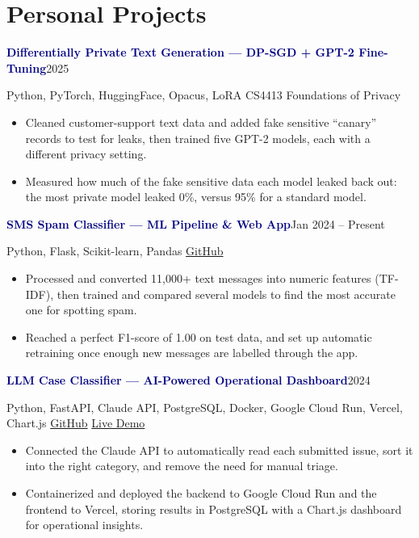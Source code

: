 \documentclass[11.5pt, letterpaper]{article}
\newcommand{\entry}[2]{\vspace{6pt}\noindent\textcolor{navy}{\bfseries #1}\hfill\textcolor{meta}{#2}\par}
\newcommand{\sub}[1]{\noindent\textcolor{meta}{#1}\par\vspace{4pt}}
\begin{document}
\section{Personal Projects}
\entry{Differentially Private Text Generation --- DP-SGD + GPT-2 Fine-Tuning}{2025}
\sub{Python, PyTorch, HuggingFace, Opacus, LoRA \enspace\textcolor{meta}{\textbullet}\enspace CS4413 Foundations of Privacy}
\begin{itemize}
  \item Cleaned customer-support text data and added fake sensitive ``canary'' records to test for leaks, then trained five GPT-2 models, each with a different privacy setting.
  \item Measured how much of the fake sensitive data each model leaked back out: the most private model leaked 0\%, versus 95\% for a standard model.
\end{itemize}
\entry{SMS Spam Classifier --- ML Pipeline \& Web App}{Jan 2024 -- Present}
\sub{Python, Flask, Scikit-learn, Pandas \enspace\textcolor{meta}{\textbullet}\enspace \href{https://github.com/Kazisakin/SMS-Spam-Classifier}{GitHub}}
\begin{itemize}
  \item Processed and converted 11,000+ text messages into numeric features (TF-IDF), then trained and compared several models to find the most accurate one for spotting spam.
  \item Reached a perfect F1-score of 1.00 on test data, and set up automatic retraining once enough new messages are labelled through the app.
\end{itemize}
\entry{LLM Case Classifier --- AI-Powered Operational Dashboard}{2024}
\sub{Python, FastAPI, Claude API, PostgreSQL, Docker, Google Cloud Run, Vercel, Chart.js \enspace\textcolor{meta}{\textbullet}\enspace \href{https://github.com/Kazisakin/llm-case-classifier-app}{GitHub} \enspace\textcolor{meta}{\textbullet}\enspace \href{https://llm-case-classifier-app-igs3.vercel.app}{Live Demo}}
\begin{itemize}
  \item Connected the Claude API to automatically read each submitted issue, sort it into the right category, and remove the need for manual triage.
  \item Containerized and deployed the backend to Google Cloud Run and the frontend to Vercel, storing results in PostgreSQL with a Chart.js dashboard for operational insights.
\end{itemize}

\end{document}
